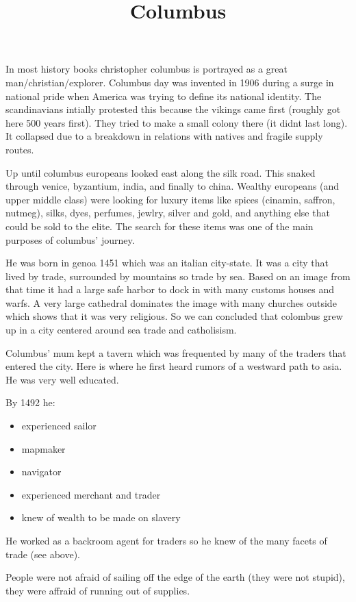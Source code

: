 \documentclass{article}
\begin{document}
\title{Columbus}
\maketitle
In most history books christopher columbus is portrayed as a great man/christian/explorer. Columbus day was invented in 1906 during a surge in national pride when America was trying to define its national identity. The scandinavians intially protested this because the vikings came first (roughly got here 500 years first). They tried to make a small colony there (it didnt last long). It collapsed due to a breakdown in relations with natives and fragile supply routes.

Up until columbus europeans looked east along the silk road. This snaked through venice, byzantium, india, and finally to china. Wealthy europeans (and upper middle class) were looking for luxury items like spices (cinamin, saffron, nutmeg), silks, dyes, perfumes, jewlry, silver and gold, and anything else that could be sold to the elite. The search for these items was one of the main purposes of columbus' journey.

He was born in genoa 1451 which was an italian city-state. It was a city that lived by trade, surrounded by mountains so trade by sea. Based on an image from that time it had a large safe harbor to dock in with many customs houses and warfs. A very large cathedral dominates the image with many churches outside which shows that it was very religious. So we can concluded that colombus grew up in a city centered around sea trade and catholisism.

Columbus' mum kept a tavern which was frequented by many of the traders that entered the city. Here is where he first heard rumors of a westward path to asia. He was very well educated.

By 1492 he:
\begin{itemize}
	\item experienced sailor
	\item mapmaker
	\item navigator
	\item experienced merchant and trader
	\item knew of wealth to be made on slavery
\end{itemize}

He worked as a backroom agent for traders so he knew of the many facets of trade (see above).

People were not afraid of sailing off the edge of the earth (they were not stupid), they were affraid of running out of supplies.
\end{document}
